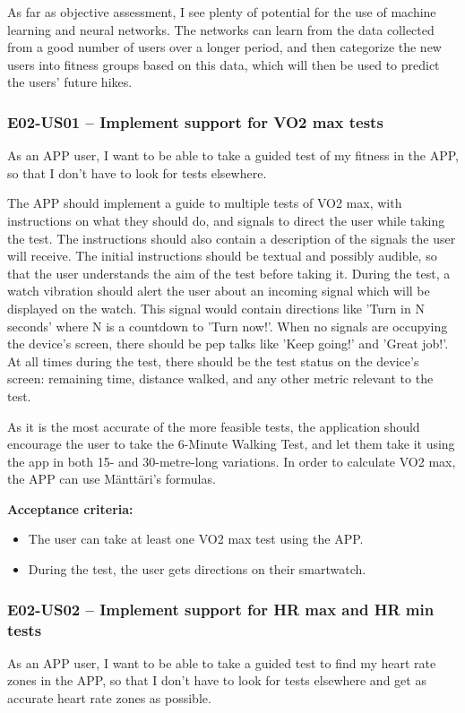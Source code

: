As far as objective assessment, I see plenty of potential for the use of machine learning and neural networks.
The networks can learn from the data collected from a good number of users over a longer period, and then categorize the new users into fitness groups based on this data, which will then be used to predict the users' future hikes.

\subsubsection*{E02-US01 -- Implement support for VO2 max tests}
As an APP user, I want to be able to take a guided test of my fitness in the APP, so that I don't have to look for tests elsewhere.

The APP should implement a guide to multiple tests of VO2 max, with instructions on what they should do, and signals to direct the user while taking the test.
The instructions should also contain a description of the signals the user will receive.
The initial instructions should be textual and possibly audible, so that the user understands the aim of the test before taking it.
During the test, a watch vibration should alert the user about an incoming signal which will be displayed on the watch.
This signal would contain directions like 'Turn in N seconds' where N is a countdown to 'Turn now!'.
When no signals are occupying the device's screen, there should be pep talks like 'Keep going!' and 'Great job!'.
At all times during the test, there should be the test status on the device's screen: remaining time, distance walked, and any other metric relevant to the test.

As it is the most accurate of the more feasible tests, the application should encourage the user to take the 6-Minute Walking Test, and let them take it using the app in both 15- and 30-metre-long variations.
In order to calculate VO2 max, the APP can use Mänttäri's formulas.

\textbf{Acceptance criteria:}
\begin{itemize}
    \item The user can take at least one VO2 max test using the APP.
    \item During the test, the user gets directions on their smartwatch.
\end{itemize}

\subsubsection*{E02-US02 -- Implement support for HR max and HR min tests}
As an APP user, I want to be able to take a guided test to find my heart rate zones in the APP, so that I don't have to look for tests elsewhere and get as accurate heart rate zones as possible.

